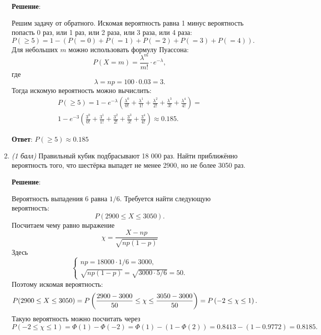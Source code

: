 \documentclass{article}
\begin{document}
\begin{enumerate}
    \textbf{Решение}:

    Решим задачу от обратного. Искомая вероятность равна 1 минус вероятность попасть 0 раз, или 1 раз, или 2 раза, или 3 раза, или 4 раза:
    \begin{equation}
        P(\geq 5) = 1 - (P(=0) + P(=1) + P(=2) + P(=3) + P(=4)).
    \end{equation}
    Для небольших $m$ можно использовать формулу Пуассона:
    \begin{equation}
        P(X = m) = \frac{\lambda^m}{m!}\cdot e^{-\lambda},
    \end{equation}
    где
    \begin{equation}
        \lambda = np = 100 \cdot 0.03 = 3.
    \end{equation}
    Тогда искомую вероятность можно вычислить:
    \begin{eqnarray}
        P(\geq 5) = 1 - e^{-\lambda}(\frac{\lambda^0}{0!} + \frac{\lambda^1}{1!} + \frac{\lambda^2}{2!} + \frac{\lambda^3}{3!} + \frac{\lambda^4}{4!}) = \\
        1 - e^{-3}(\frac{3^0}{0!} + \frac{3^1}{1!} + \frac{3^2}{2!} + \frac{3^3}{3!} + \frac{3^4}{4!}) \approx 0.185.
    \end{eqnarray}

    \textbf{Ответ}:
    $P(\geq 5) \approx 0.185$
    
    \item \textit{(1 балл)} Правильный кубик подбрасывают 18 000 раз. Найти приближённо вероятность того, что шестёрка выпадет не менее 2900, но не более 3050 раз.
    

    \textbf{Решение}:

    Вероятность выпадения 6 равна $1/6$. Требуется найти следующую вероятность:
    \begin{equation}
        P(2900 \leq X \leq 3050).
    \end{equation}
    Посчитаем чему равно выражение
    $$\chi = \frac{X-np}{\sqrt{np(1-p)}}$$
    Здесь
    \begin{equation}
        \begin{cases}
            np = 18000 \cdot 1/6 = 3000,\\
            \sqrt{np(1-p)} = \sqrt{3000\cdot5/6} = 50.
        \end{cases}
    \end{equation}
    Поэтому искомая вероятность:
    \begin{equation}
        P(2900 \leq X \leq 3050) = P\left(\frac{2900 - 3000}{50} \leq \chi \leq \frac{3050 - 3000}{50}\right) = \\
        P\left(-2 \leq \chi \leq 1\right).
    \end{equation}
    Такую вероятность можно посчитать через
    \begin{equation}
        P\left(-2 \leq \chi \leq 1\right) = \Phi(1) - \Phi(-2) = \Phi(1) - (1 - \Phi(2)) = 0.8413 - (1 - 0.9772) = 0.8185.
    \end{equation}


\end{enumerate}
\end{document}
